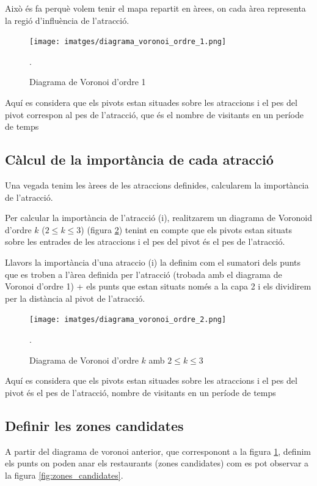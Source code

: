 \documentclass[12pt]{article}
\begin{document}
Això és fa perquè volem tenir el mapa repartit en àrees, on cada àrea representa la regió d’influència de l’atracció. 

\begin{figure}[H]
	\centering
	\texttt{[image: imatges/diagrama\_voronoi\_ordre\_1.png]}\par\vspace{1cm}
	\caption{Diagrama de Voronoi d'ordre 1}.
	\label{fig:diagrama_voronoi_ordre_1}
\end{figure}

Aquí es considera que els pivots estan situades sobre les atraccions i el pes del pivot correspon al pes de l'atracció, que és el nombre de visitants en un període de temps

\subsection{Càlcul de la importància de cada atracció}
Una vegada tenim les àrees de les atraccions definides, calcularem la importància de l’atracció.

Per calcular la importància de l'atracció (i), realitzarem un diagrama de Voronoid d'ordre $k$ ($2 \le k \le 3$) (figura \ref{fig:diagrama_voronoi_ordre_2}) tenint en compte que els pivots estan situats sobre les entrades de les atraccions i el pes del pivot és el pes de l’atracció. 

Llavors la importància d'una atraccio (i) la definim com el sumatori dels punts que es troben a l'àrea definida per l’atracció (trobada amb el diagrama de Voronoi d'ordre 1) + els punts que estan situats només a la capa 2 i els dividirem per la distància al pivot de l'atracció.

\begin{figure}[H]
	\centering
	\texttt{[image: imatges/diagrama\_voronoi\_ordre\_2.png]}\par\vspace{1cm}
	\caption{Diagrama de Voronoi d'ordre $k$ amb $2 \le k \le 3$}.
	\label{fig:diagrama_voronoi_ordre_2}
\end{figure}

Aquí es considera que els pivots estan situades sobre les atraccions i el pes del pivot és el pes de l'atracció, nombre de visitants en un període de temps

\subsection{Definir les zones candidates}
A partir del diagrama de voronoi anterior, que corresponont a la figura \ref{fig:diagrama_voronoi_ordre_1}, definim els punts on poden anar els restaurants (zones candidates) com es pot observar a la figura \ref{fig:zones_candidates}.
\end{document}
